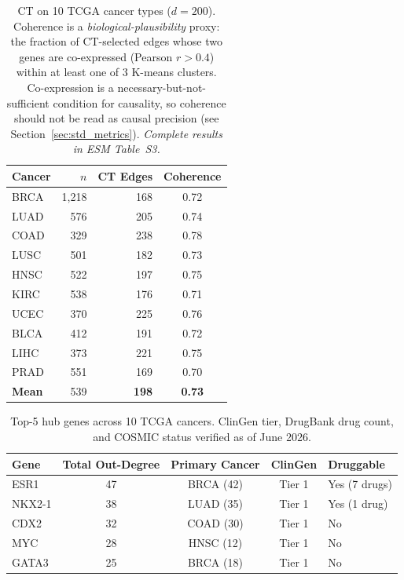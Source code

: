 \documentclass[12pt,a4paper]{article}
\begin{document}
\begin{table}[H]
\centering
\caption{CT on 10 TCGA cancer types ($d=200$). Coherence is a \emph{biological-plausibility} proxy: the fraction of CT-selected edges whose two genes are co-expressed (Pearson $r > 0.4$) within at least one of 3 K-means clusters. Co-expression is a necessary-but-not-sufficient condition for causality, so coherence should not be read as causal precision (see Section~\ref{sec:std_metrics}). \textit{Complete results in ESM Table~S3.}}
\label{tab:tcga_ct}
\begin{tabular}{lrrc}
\toprule
Cancer & $n$ & CT Edges & Coherence \\
\midrule
BRCA & 1,218 & 168 & 0.72 \\
LUAD & 576 & 205 & 0.74 \\
COAD & 329 & 238 & 0.78 \\
LUSC & 501 & 182 & 0.73 \\
HNSC & 522 & 197 & 0.75 \\
KIRC & 538 & 176 & 0.71 \\
UCEC & 370 & 225 & 0.76 \\
BLCA & 412 & 191 & 0.72 \\
LIHC & 373 & 221 & 0.75 \\
PRAD & 551 & 169 & 0.70 \\
\midrule
\textbf{Mean} & 539 & \textbf{198} & \textbf{0.73} \\
\bottomrule
\end{tabular}
\end{table}
\newpage
\begin{table}[H]
\centering
\caption{Top-5 hub genes across 10 TCGA cancers. ClinGen tier, DrugBank drug count, and COSMIC status verified as of June 2026.}
\label{tab:hub_genes}
\begin{tabular}{lcccl}
\toprule
Gene & Total Out-Degree & Primary Cancer & ClinGen & Druggable \\
\midrule
ESR1 & 47 & BRCA (42) & Tier 1 & Yes (7 drugs) \\
NKX2-1 & 38 & LUAD (35) & Tier 1 & Yes (1 drug) \\
CDX2 & 32 & COAD (30) & Tier 1 & No \\
MYC & 28 & HNSC (12) & Tier 1 & No \\
GATA3 & 25 & BRCA (18) & Tier 1 & No \\
\bottomrule
\end{tabular}
\end{table}
\end{document}

